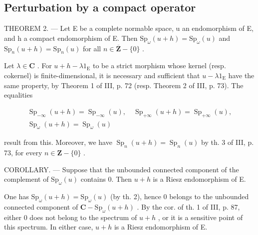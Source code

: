 \subsection{Perturbation by a compact operator}

THEOREM 2. --- Let E be a complete normable space, u an endomorphism of E, and h a compact endomorphism of E. Then \(\mathrm{Sp}_{\omega}(u + h) = \mathrm{Sp}_{\omega}(u)\) and \(\mathrm{Sp}_n(u + h) = \mathrm{Sp}_n(u)\) for all \(n \in \overline{\mathbf{Z}} - \{0\}\) .

Let \(\lambda \in \mathbf{C}\) . For \(u + h - \lambda 1_{\mathrm{E}}\) to be a strict morphism whose kernel (resp. cokernel) is finite-dimensional, it is necessary and sufficient that \(u - \lambda 1_{\mathrm{E}}\) have the same property, by Theorem 1 of III, p. 72 (resp. Theorem 2 of III, p. 73). The equalities

\[
\begin{array}{c} \operatorname{Sp} _ {- \infty} (u + h) = \operatorname{Sp} _ {- \infty} (u), \quad \operatorname{Sp} _ {+ \infty} (u + h) = \operatorname{Sp} _ {+ \infty} (u), \\ \operatorname{Sp} _ {\omega} (u + h) = \operatorname{Sp} _ {\omega} (u) \end{array}
\]

result from this. Moreover, we have \(\operatorname{Sp}_{n}(u+h)=\operatorname{Sp}_{n}(u)\) by th. 3 of III, p. 73, for every \(n\in \mathbf{Z}-\{0\}\) .

COROLLARY. --- Suppose that the unbounded connected component of the complement of \(\mathrm{Sp}_{\omega}(u)\) contains 0. Then \(u + h\) is a Riesz endomorphism of E.

One has \(\mathrm{Sp}_{\omega}(u+h)=\mathrm{Sp}_{\omega}(u)\) (by th. 2), hence 0 belongs to the unbounded connected component of \(\mathbf{C}-\mathrm{Sp}_{\omega}(u+h)\) . By the cor. of th. 1 of III, p. 87, either 0 does not belong to the spectrum of \(u+h\) , or it is a sensitive point of this spectrum. In either case, \(u+h\) is a Riesz endomorphism of E.

